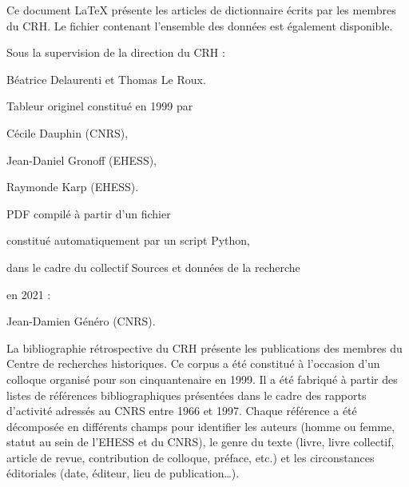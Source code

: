 \documentclass{article}
\begin{document}

\newpage
\thispagestyle{empty}

\begin{center}
	\begin{itshape}
		
		Ce document \LaTeX{} présente les articles de dictionnaire écrits par les membres du CRH. Le fichier  contenant l'ensemble des données est également disponible.
		
		\bigskip
		
		Sous la supervision de la direction du CRH :
		
		Béatrice Delaurenti et Thomas Le Roux.
		
		\medskip
		
		Tableur originel constitué en 1999 par
		
		\medskip
		
		Cécile Dauphin (CNRS),
		
		Jean-Daniel Gronoff (EHESS),
		
		Raymonde Karp (EHESS).
		
		\bigskip
		
		PDF compilé à partir d'un fichier 
		
		constitué automatiquement par un script Python,
		
		dans le cadre du collectif \og Sources et données de la recherche \fg
		
		en 2021 :
		
		\medskip
		
		Jean-Damien Généro (CNRS).
		
		\bigskip
		
		La bibliographie rétrospective du CRH présente les publications des membres du Centre de recherches historiques. Ce corpus a été constitué à l’occasion d’un colloque organisé pour son cinquantenaire en 1999. Il a été fabriqué à partir des listes de références bibliographiques présentées dans le cadre des rapports d’activité adressés au CNRS entre 1966 et 1997. Chaque référence a été décomposée en différents champs pour identifier les auteurs (homme ou femme, statut au sein de l’EHESS et du CNRS), le genre du texte (livre, livre collectif, article de revue, contribution de colloque, préface, etc.) et les circonstances éditoriales (date, éditeur, lieu de publication…). 
		
		\bigskip
		

\end{itshape}
\end{center}
\end{document}
